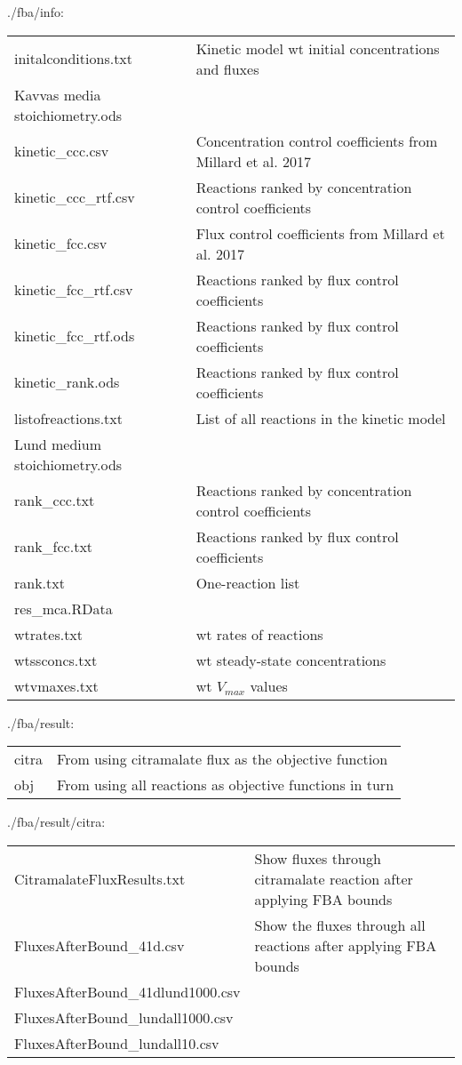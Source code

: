 \documentclass[a4paper, parskip=full]{scrreprt}
\begin{document}
./fba/info:

\begin{tabularx}{\linewidth}{LL}
initalconditions.txt & Kinetic model wt initial concentrations and fluxes\\
Kavvas media stoichiometry.ods\\
kinetic\_ccc.csv & Concentration control coefficients from Millard et al. 2017\\
kinetic\_ccc\_rtf.csv & Reactions ranked by concentration control coefficients\\
kinetic\_fcc.csv & Flux control coefficients from Millard et al. 2017\\
kinetic\_fcc\_rtf.csv & Reactions ranked by flux control coefficients\\
kinetic\_fcc\_rtf.ods & Reactions ranked by flux control coefficients\\
kinetic\_rank.ods & Reactions ranked by flux control coefficients\\
listofreactions.txt & List of all reactions in the kinetic model\\
Lund medium stoichiometry.ods\\
rank\_ccc.txt & Reactions ranked by concentration control coefficients\\
rank\_fcc.txt & Reactions ranked by flux control coefficients\\
rank.txt & One-reaction list\\
res\_mca.RData\\
wtrates.txt & wt rates of reactions\\
wtssconcs.txt & wt steady-state concentrations\\
wtvmaxes.txt & wt $V_{max}$ values
\end{tabularx}

./fba/result:

\begin{tabularx}{\linewidth}{LL}
citra & From using citramalate flux as the objective function\\
obj & From using all reactions as objective functions in turn
\end{tabularx}

./fba/result/citra:

\begin{tabularx}{\linewidth}{LL}
CitramalateFluxResults.txt & Show fluxes through citramalate reaction after applying FBA bounds\\
FluxesAfterBound\_41d.csv & Show the fluxes through all reactions after applying FBA bounds\\
FluxesAfterBound\_41dlund1000.csv\\
FluxesAfterBound\_lundall1000.csv\\
FluxesAfterBound\_lundall10.csv
\end{tabularx}
\end{document}
